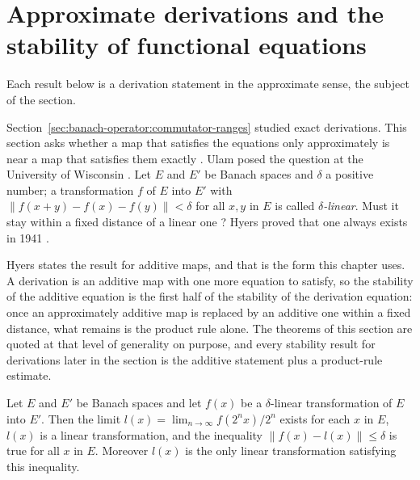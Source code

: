 \section{Approximate derivations and the stability of functional equations}\label{sec:banach-operator:stability}

Each result below is a derivation statement in the approximate sense, the subject of the section.

Section~\ref{sec:banach-operator:commutator-ranges} studied exact
derivations. This section asks whether a map that satisfies the equations
only approximately is near a map that satisfies them exactly
\cite[p.~222]{Hyers1941Stability}. Ulam posed the question at the
University of Wisconsin \cite[p.~222]{Hyers1941Stability}. Let $E$ and
$E'$ be Banach spaces and $\delta$ a positive number; a transformation
$f$ of $E$ into $E'$ with $\|f(x+y)-f(x)-f(y)\|<\delta$ for all $x,y$ in
$E$ is called \emph{$\delta$-linear}. Must it stay within a fixed
distance of a linear one \cite[p.~222]{Hyers1941Stability}? Hyers proved
that one always exists in 1941 \cite[Theorem~1, p.~223]{Hyers1941Stability}.

Hyers states the result for additive maps, and that is the form this chapter
uses. A derivation is an additive map with one more equation to satisfy, so the
stability of the additive equation is the first half of the stability of the
derivation equation: once an approximately additive map is replaced by an
additive one within a fixed distance, what remains is the product rule alone.
The theorems of this section are quoted at that level of generality on purpose,
and every stability result for derivations later in the section is the additive
statement plus a product-rule estimate.

\begin{theorem}\label{thm:banach:hyers}
Let $E$ and $E'$ be Banach spaces and let $f(x)$ be a $\delta$-linear
transformation of $E$ into $E'$. Then the limit
$l(x)=\lim_{n\to\infty}f(2^nx)/2^n$ exists for each $x$ in $E$, $l(x)$ is
a linear transformation, and the inequality $\|f(x)-l(x)\|\le\delta$ is
true for all $x$ in $E$. Moreover $l(x)$ is the only linear transformation
satisfying this inequality.
\end{theorem}

